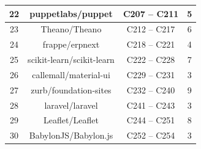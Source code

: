 \begin{appendices}
\begin{table}[htb]
\begin{tabular}{|c|c|c|c|}
		\hline
		22    & puppetlabs/puppet & C207 -- C211 & 5 \bigstrut\\
		\hline
		23    & Theano/Theano & C212 -- C217 & 6 \bigstrut\\
		\hline
		24    & frappe/erpnext & C218 -- C221 & 4 \bigstrut\\
		\hline
		25    & scikit-learn/scikit-learn & C222 -- C228 & 7 \bigstrut\\
		\hline
		26    & callemall/material-ui & C229 -- C231 & 3 \bigstrut\\
		\hline
		27    & zurb/foundation-sites & C232 -- C240 & 9 \bigstrut\\
		\hline
		28    & laravel/laravel & C241 -- C243 & 3 \bigstrut\\
		\hline
		29    & Leaflet/Leaflet & C244 -- C251 & 8 \bigstrut\\
		\hline
		30    & BabylonJS/Babylon.js & C252 -- C254 & 3 \bigstrut\\
		\hline
	\end{tabular}%
	\label{tab:participants_per_project_part_i}%
\end{table}%


\end{appendices}
